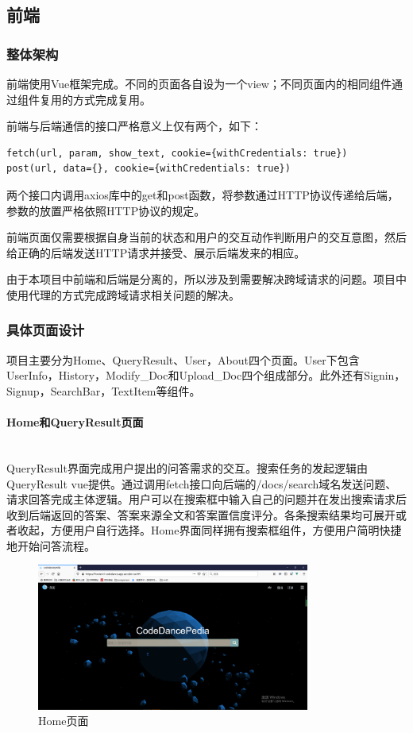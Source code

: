 \documentclass[12pt]{article}
\newcommand{\myparagraph}[1]{\paragraph{#1}\mbox{}\\}
\begin{document}
\subsection{前端}  %
\subsubsection{整体架构}
前端使用Vue框架完成。不同的页面各自设为一个view；不同页面内的相同组件通过组件复用的方式完成复用。

前端与后端通信的接口严格意义上仅有两个，如下：
\begin{lstlisting}
fetch(url, param, show_text, cookie={withCredentials: true})
post(url, data={}, cookie={withCredentials: true})
\end{lstlisting}

两个接口内调用axios库中的get和post函数，将参数通过HTTP协议传递给后端，参数的放置严格依照HTTP协议的规定。

前端页面仅需要根据自身当前的状态和用户的交互动作判断用户的交互意图，然后给正确的后端发送HTTP请求并接受、展示后端发来的相应。

由于本项目中前端和后端是分离的，所以涉及到需要解决跨域请求的问题。项目中使用代理的方式完成跨域请求相关问题的解决。


\subsubsection{具体页面设计}

项目主要分为Home、QueryResult、User，About四个页面。User下包含UserInfo，History，Modify\_Doc和Upload\_Doc四个组成部分。此外还有Signin，Signup，SearchBar，TextItem等组件。

\myparagraph{Home和QueryResult页面}

QueryResult界面完成用户提出的问答需求的交互。搜索任务的发起逻辑由QueryResult vue提供。通过调用fetch接口向后端的/docs/search域名发送问题、请求回答完成主体逻辑。用户可以在搜索框中输入自己的问题并在发出搜索请求后收到后端返回的答案、答案来源全文和答案置信度评分。各条搜索结果均可展开或者收起，方便用户自行选择。Home界面同样拥有搜索框组件，方便用户简明快捷地开始问答流程。

\begin{figure}[htbp]  %
    \centering  %
    \includegraphics[width=0.8\textwidth]{fig/home.PNG}  %
    \caption{Home页面}  %
    \label{fig:structure}  %
\end{figure}
\end{document}
